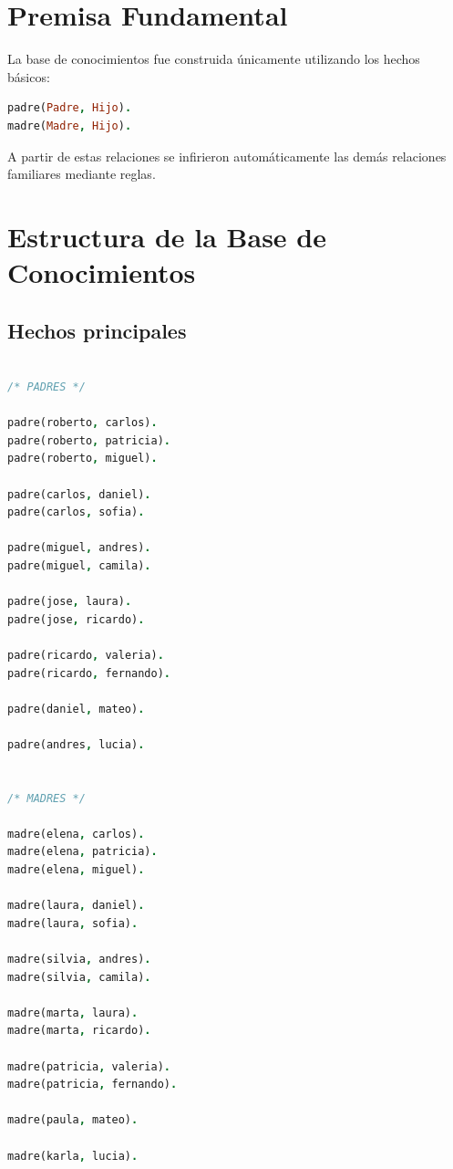 \documentclass[12pt]{article}
\begin{document}
\section{Premisa Fundamental}

La base de conocimientos fue construida únicamente utilizando los hechos básicos:

\begin{lstlisting}[language=Prolog]
padre(Padre, Hijo).
madre(Madre, Hijo).
\end{lstlisting}

A partir de estas relaciones se infirieron automáticamente las demás relaciones familiares mediante reglas.

\section{Estructura de la Base de Conocimientos}

\subsection{Hechos principales}

\begin{lstlisting}[language=Prolog]

/* PADRES */

padre(roberto, carlos).
padre(roberto, patricia).
padre(roberto, miguel).

padre(carlos, daniel).
padre(carlos, sofia).

padre(miguel, andres).
padre(miguel, camila).

padre(jose, laura).
padre(jose, ricardo).

padre(ricardo, valeria).
padre(ricardo, fernando).

padre(daniel, mateo).

padre(andres, lucia).


/* MADRES */

madre(elena, carlos).
madre(elena, patricia).
madre(elena, miguel).

madre(laura, daniel).
madre(laura, sofia).

madre(silvia, andres).
madre(silvia, camila).

madre(marta, laura).
madre(marta, ricardo).

madre(patricia, valeria).
madre(patricia, fernando).

madre(paula, mateo).

madre(karla, lucia).

\end{lstlisting}
\end{document}
